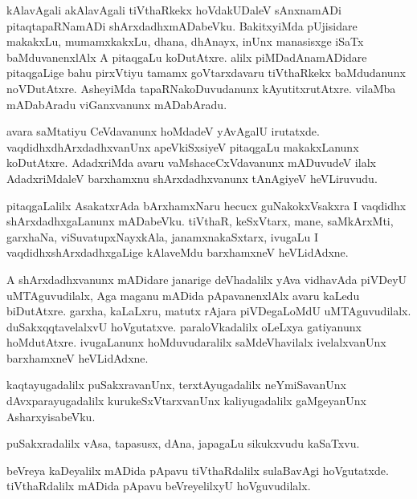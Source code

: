 \begin{mng}
kAlavAgali akAlavAgali tiVthaRkekx hoVdakUDaleV sAnxnamADi pitaqtapaRNamADi shArxdadhxmADabeVku. BakitxyiMda pUjisidare makakxLu, mumamxkakxLu, dhana, dhAnayx, inUnx manasisxge iSaTx baMduvanenxlAlx A pitaqgaLu koDutAtxre. alilx piMDadAnamADidare pitaqgaLige bahu pirxVtiyu tamamx goVtarxdavaru tiVthaRkekx baMdudanunx noVDutAtxre. AsheyiMda tapaRNakoDuvudanunx kAyutitxrutAtxre. vilaMba mADabAradu viGanxvanunx mADabAradu.
\end{mng}

\begin{mng}
avara saMtatiyu CeVdavanunx hoMdadeV yAvAgalU irutatxde. vaqdidhxdhArxdadhxvanUnx apeVkiSxsiyeV pitaqgaLu makakxLanunx koDutAtxre. AdadxriMda avaru vaMshaceCxVdavanunx mADuvudeV ilalx AdadxriMdaleV barxhamxnu shArxdadhxvanunx tAnAgiyeV heVLiruvudu.
\end{mng}

\begin{mng}
pitaqgaLalilx AsakatxrAda bArxhamxNaru hecucx guNakokxVsakxra I vaqdidhx shArxdadhxgaLanunx mADabeVku. tiVthaR, keSxVtarx, mane, saMkArxMti, garxhaNa, viSuvatupxNayxkAla, janamxnakaSxtarx, ivugaLu I vaqdidhxshArxdadhxgaLige kAlaveMdu barxhamxneV heVLidAdxne.
\end{mng}

\begin{mng}
A shArxdadhxvanunx mADidare janarige deVhadalilx yAva vidhavAda piVDeyU uMTAguvudilalx, Aga maganu mADida pApavanenxlAlx avaru kaLedu biDutAtxre. garxha, kaLaLxru, matutx rAjara piVDegaLoMdU uMTAguvudilalx. duSakxqqtavelalxvU hoVgutatxve. paraloVkadalilx oLeLxya gatiyanunx hoMdutAtxre. ivugaLanunx hoMduvudaralilx saMdeVhavilalx ivelalxvanUnx barxhamxneV heVLidAdxne.
\end{mng}

\begin{mng}
kaqtayugadalilx puSakxravanUnx, terxtAyugadalilx neYmiSavanUnx dAvxparayugadalilx kurukeSxVtarxvanUnx kaliyugadalilx gaMgeyanUnx AsharxyisabeVku.
\end{mng}

\begin{mng}
puSakxradalilx vAsa, tapasusx, dAna, japagaLu sikukxvudu kaSaTxvu. 
\end{mng}

\begin{mng}
beVreya kaDeyalilx mADida pApavu tiVthaRdalilx sulaBavAgi hoVgutatxde. tiVthaRdalilx mADida pApavu beVreyelilxyU hoVguvudilalx. 
\end{mng}

